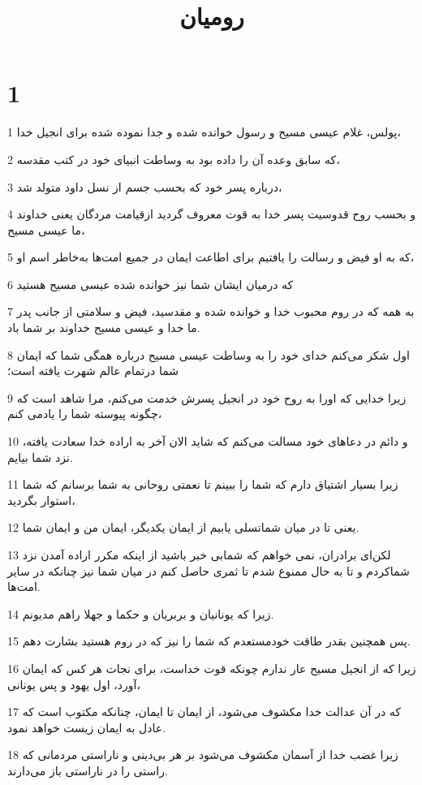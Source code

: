 

\title{روميان}


\chapter{1}

\par 1 پولس، غلام عیسی مسیح و رسول خوانده شده و جدا نموده شده برای انجیل خدا،
\par 2 که سابق وعده آن را داده بود به وساطت انبیای خود در کتب مقدسه،
\par 3 درباره پسر خود که بحسب جسم از نسل داود متولد شد،
\par 4 و بحسب روح قدوسیت پسر خدا به قوت معروف گردید ازقیامت مردگان یعنی خداوند ما عیسی مسیح،
\par 5 که به او فیض و رسالت را یافتیم برای اطاعت ایمان در جمیع امت‌ها به‌خاطر اسم او،
\par 6 که درمیان ایشان شما نیز خوانده شده عیسی مسیح هستید
\par 7 به همه که در روم محبوب خدا و خوانده شده و مقدسید، فیض و سلامتی از جانب پدر ما خدا و عیسی مسیح خداوند بر شما باد.
\par 8 اول شکر می‌کنم خدای خود را به وساطت عیسی مسیح درباره همگی شما که ایمان شما درتمام عالم شهرت یافته است؛
\par 9 زیرا خدایی که اورا به روح خود در انجیل پسرش خدمت می‌کنم، مرا شاهد است که چگونه پیوسته شما را یادمی کنم،
\par 10 و دائم در دعاهای خود مسالت می‌کنم که شاید الان آخر به اراده خدا سعادت یافته، نزد شما بیایم.
\par 11 زیرا بسیار اشتیاق دارم که شما را ببینم تا نعمتی روحانی به شما برسانم که شما استوار بگردید،
\par 12 یعنی تا در میان شماتسلی یابیم از ایمان یکدیگر، ایمان من و ایمان شما.
\par 13 لکن‌ای برادران، نمی خواهم که شمابی خبر باشید از اینکه مکرر اراده آمدن نزد شماکردم و تا به حال ممنوع شدم تا ثمری حاصل کنم در میان شما نیز چنانکه در سایر امت‌ها.
\par 14 زیرا که یونانیان و بربریان و حکما و جهلا راهم مدیونم.
\par 15 پس همچنین بقدر طاقت خودمستعدم که شما را نیز که در روم هستید بشارت دهم.
\par 16 زیرا که از انجیل مسیح عار ندارم چونکه قوت خداست، برای نجات هر کس که ایمان آورد، اول یهود و پس یونانی،
\par 17 که در آن عدالت خدا مکشوف می‌شود، از ایمان تا ایمان، چنانکه مکتوب است که عادل به ایمان زیست خواهد نمود.
\par 18 زیرا غضب خدا از آسمان مکشوف می‌شود بر هر بی‌دینی و ناراستی مردمانی که راستی را در ناراستی باز می‌دارند.
